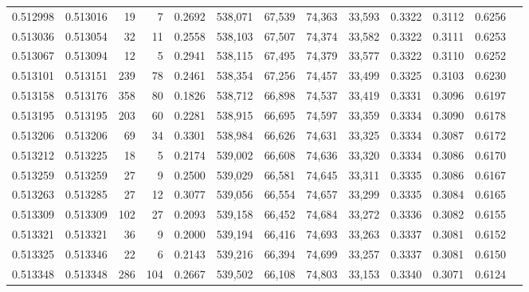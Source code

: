 \begin{tabular}{rrrrrrrrrrrrr}
0.512998 & 0.513016 &    19 &     7 &                                     0.2692 & 538,071 &  67,539 &  74,363 &  33,593 & 0.3322 & 0.3112 & 0.6256 \\
0.513036 & 0.513054 &    32 &    11 &                                     0.2558 & 538,103 &  67,507 &  74,374 &  33,582 & 0.3322 & 0.3111 & 0.6253 \\
0.513067 & 0.513094 &    12 &     5 &                                     0.2941 & 538,115 &  67,495 &  74,379 &  33,577 & 0.3322 & 0.3110 & 0.6252 \\
0.513101 & 0.513151 &   239 &    78 &                                     0.2461 & 538,354 &  67,256 &  74,457 &  33,499 & 0.3325 & 0.3103 & 0.6230 \\
0.513158 & 0.513176 &   358 &    80 &                                     0.1826 & 538,712 &  66,898 &  74,537 &  33,419 & 0.3331 & 0.3096 & 0.6197 \\
0.513195 & 0.513195 &   203 &    60 &                                     0.2281 & 538,915 &  66,695 &  74,597 &  33,359 & 0.3334 & 0.3090 & 0.6178 \\
0.513206 & 0.513206 &    69 &    34 &                                     0.3301 & 538,984 &  66,626 &  74,631 &  33,325 & 0.3334 & 0.3087 & 0.6172 \\
0.513212 & 0.513225 &    18 &     5 &                                     0.2174 & 539,002 &  66,608 &  74,636 &  33,320 & 0.3334 & 0.3086 & 0.6170 \\
0.513259 & 0.513259 &    27 &     9 &                                     0.2500 & 539,029 &  66,581 &  74,645 &  33,311 & 0.3335 & 0.3086 & 0.6167 \\
0.513263 & 0.513285 &    27 &    12 &                                     0.3077 & 539,056 &  66,554 &  74,657 &  33,299 & 0.3335 & 0.3084 & 0.6165 \\
0.513309 & 0.513309 &   102 &    27 &                                     0.2093 & 539,158 &  66,452 &  74,684 &  33,272 & 0.3336 & 0.3082 & 0.6155 \\
0.513321 & 0.513321 &    36 &     9 &                                     0.2000 & 539,194 &  66,416 &  74,693 &  33,263 & 0.3337 & 0.3081 & 0.6152 \\
0.513325 & 0.513346 &    22 &     6 &                                     0.2143 & 539,216 &  66,394 &  74,699 &  33,257 & 0.3337 & 0.3081 & 0.6150 \\
0.513348 & 0.513348 &   286 &   104 &                                     0.2667 & 539,502 &  66,108 &  74,803 &  33,153 & 0.3340 & 0.3071 & 0.6124 \\

\end{tabular}
